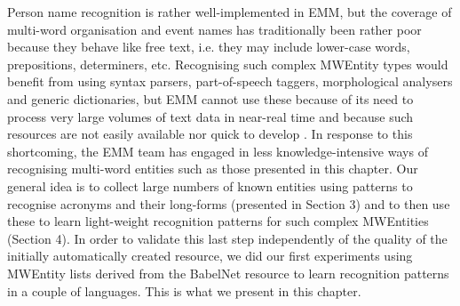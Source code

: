 \documentclass[output=paper]{langsci/langscibook}
\begin{document}
 
%
% 
%

Person name recognition is rather well-implemented in EMM, but the coverage of multi-word organisation and event names has traditionally been rather poor because they behave like free text, i.e. they may include lower-case words, prepositions, determiners, etc. Recognising such complex MWEntity types would benefit from using syntax parsers, part-of-speech taggers, morphological analysers and generic dictionaries, but EMM cannot use these because of its need to process very large volumes of text data in near-real time and because such resources are not easily available nor quick to develop \citep{steinberger-13}. In response to this shortcoming, the EMM team has engaged in less knowledge-intensive ways of recognising multi-word entities such as those presented in this chapter. Our general idea is to collect large numbers of known entities using patterns to recognise acronyms and their long-forms (presented in Section 3) and to then use these to learn light-weight recognition patterns for such complex MWEntities (Section 4). In order to validate this last step independently of the quality of the initially automatically created resource, we did our first experiments using MWEntity lists derived from the BabelNet resource to learn recognition patterns in a couple of languages. This is what we present in this chapter.
\end{document}
